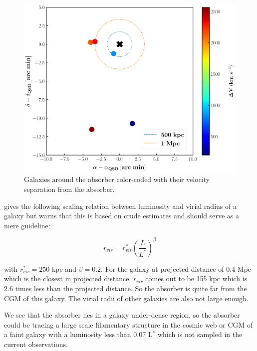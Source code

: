 \begin{figure}[!t]
\includegraphics[width=\columnwidth]{Figures/galaxy_environment.png}
\caption{Galaxies around the absorber color-coded with their velocity separation from the absorber.}
\label{fig:galaxy}
\end{figure}

\citet{Prochaska-2011} gives the following scaling relation between luminosity and virial radius of a galaxy but warns that this is based on crude estimates and should serve as a mere guideline:

$$r_{vir}=r^{*}_{vir}\left(\frac{L}{L^{*}}\right)^{\beta}$$

with $r^{*}_{vir}=250$ kpc and $\beta=0.2$. For the galaxy at projected distance of 0.4 Mpc which is the closest in projected distance, $r_{vir}$ comes out to be 155 kpc which is 2.6 times less than the projected distance. So the absorber is quite far from the CGM of this galaxy. The virial radii of other galaxies are also not large enough.

We see that the absorber lies in a galaxy under-dense region, so the absorber could be tracing a large scale filamentary structure in the cosmic web or CGM of a faint galaxy with a luminosity less than 0.07 L$^*$ which is not sampled in the current observations.



